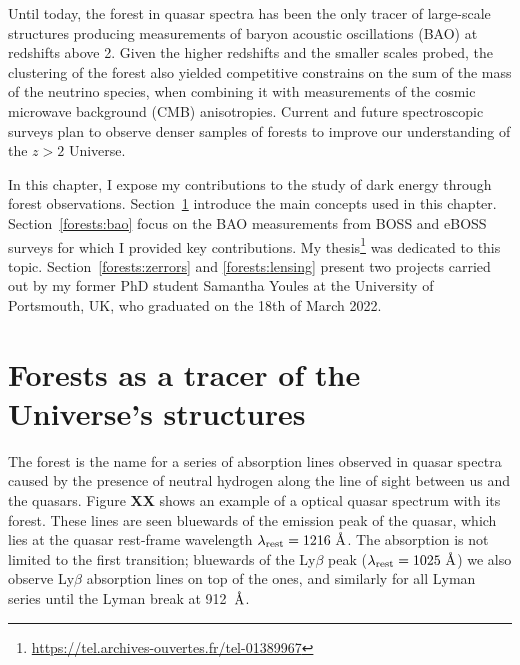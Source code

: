 \chaptertoc{}

\vspace{1em}

Until today, the \lya forest in quasar spectra has been the only 
tracer of large-scale structures producing measurements of 
baryon acoustic oscillations (BAO) at redshifts above 2. 
Given the higher redshifts and the smaller scales probed, 
the clustering of the forest also yielded competitive 
constrains on the sum of the mass of the neutrino species, 
when combining it with measurements of the cosmic microwave background (CMB)
anisotropies. Current and future spectroscopic surveys plan to observe  
denser samples of \lya forests to improve our understanding of the 
$z>2$ Universe.

In this chapter, I expose my contributions to the study of
dark energy through \lya forest observations. 
Section~\ref{forests:intro} introduce the main concepts used in 
this chapter. 
Section~\ref{forests:bao} focus on the BAO measurements from 
BOSS and eBOSS surveys for which I provided key contributions.
My thesis\footnote{\url{https://tel.archives-ouvertes.fr/tel-01389967}} 
was dedicated to this topic.
Section~\ref{forests:zerrors} and \ref{forests:lensing} 
present two projects carried out by my former PhD student  
Samantha Youles at the University of Portsmouth, UK, 
who graduated on the 18th of March 2022. 


\section{Forests as a tracer of the Universe's structures}
\label{forests:intro}

The \lya forest is the name for a series of absorption lines observed in quasar
spectra caused by the presence of neutral hydrogen along the line of 
sight between us and the quasars. 
Figure \textbf{XX} shows an example of a optical quasar spectrum with its \lya forest.
These lines are seen bluewards of the \lya emission peak of the quasar,
which lies at the quasar rest-frame wavelength $\lambda_\mathrm{rest}=1216~\angstrom$.
The absorption is not limited to the first transition; bluewards of the 
Ly$\beta$ peak ($\lambda_\mathrm{rest} = 1025~\angstrom$) we also observe 
Ly$\beta$ absorption lines on top of the \lya ones, and similarly for all
Lyman series until the Lyman break at 912~$\angstrom$.

